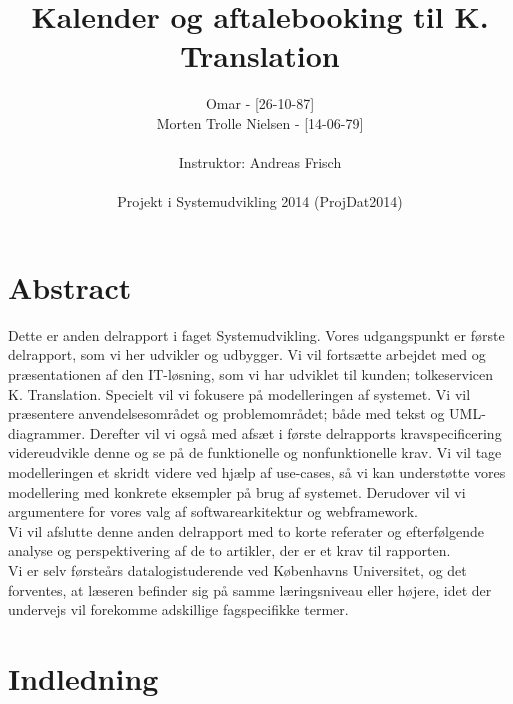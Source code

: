 \documentclass[12pt]{article}   %
\title{Kalender og aftalebooking til K. Translation}
\author{Omar  - [26-10-87]\\
     Morten Trolle Nielsen - [14-06-79]\\ \\
    Instruktor: Andreas Frisch\\ \\
Projekt i Systemudvikling 2014 (ProjDat2014)}
\begin{document}
\maketitle
\thispagestyle{empty}
\newpage
\tableofcontents
\newpage

\section{Abstract}
Dette er anden delrapport i faget Systemudvikling. Vores udgangspunkt er første
delrapport, som vi her udvikler og udbygger. Vi vil fortsætte arbejdet med og
præsentationen af den IT-løsning, som vi har udviklet til kunden; tolkeservicen
K. Translation. Specielt vil vi fokusere på modelleringen af systemet. Vi vil 
præsentere anvendelsesområdet og problemområdet; både med tekst og UML-diagrammer.
Derefter vil vi også med afsæt i første delrapports kravspecificering videreudvikle
denne og se på de funktionelle og nonfunktionelle krav. Vi vil tage modelleringen
et skridt videre ved hjælp af use-cases, så vi kan understøtte vores modellering med
konkrete eksempler på brug af systemet. Derudover vil vi argumentere for vores
valg af softwarearkitektur og webframework. \\
Vi vil afslutte denne anden delrapport med to korte referater og efterfølgende
analyse og perspektivering af de to artikler, der er et krav til rapporten.\\
Vi er selv førsteårs datalogistuderende ved Københavns Universitet, og det
forventes, at læseren befinder sig på samme læringsniveau eller højere, idet
der undervejs vil forekomme adskillige fagspecifikke termer. 

\newpage

\section{Indledning}
\end{document}
